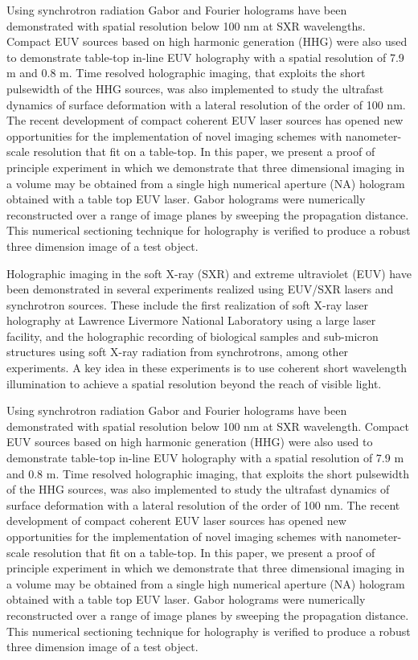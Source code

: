 \documentclass[]{IEEEphot}
\begin{document}
Using synchrotron radiation Gabor and Fourier holograms have been demonstrated with spatial resolution below 100 nm at SXR wavelengths. Compact EUV sources based on high harmonic generation (HHG) were also used to demonstrate table-top in-line EUV holography with a spatial resolution of 7.9 m and 0.8 m.  Time resolved holographic imaging, that exploits the short pulsewidth of the HHG sources, was also implemented to study the ultrafast dynamics of surface deformation with a lateral resolution of the order of 100 nm.  The recent development of compact coherent EUV laser sources  has opened new opportunities for the implementation of novel imaging schemes with nanometer-scale resolution that fit on a table-top. In this paper, we present a proof of principle experiment in which we demonstrate that three dimensional imaging in a volume may be obtained from a single high numerical  aperture (NA) hologram obtained with a table top EUV laser. Gabor holograms were numerically reconstructed over a range of image planes by sweeping the propagation distance. This numerical sectioning technique for holography is verified to produce a robust three dimension image of a test object.  

Holographic imaging in the soft X-ray (SXR) and extreme ultraviolet (EUV) have been demonstrated in several experiments realized using EUV/SXR lasers and synchrotron sources. These include the first realization of soft X-ray laser holography at Lawrence Livermore National Laboratory using a large laser facility, and the holographic recording of biological samples and sub-micron structures using soft X-ray radiation from synchrotrons, among other experiments.  A key idea in these experiments is to use coherent short wavelength illumination to achieve a spatial resolution beyond the reach of visible light.  

Using synchrotron radiation Gabor and Fourier holograms have been demonstrated with spatial resolution below 100 nm at SXR wavelength.  Compact EUV sources based on high harmonic generation (HHG) were also used to demonstrate table-top in-line EUV holography with a spatial resolution of 7.9 m and 0.8 m.  Time resolved holographic imaging, that exploits the short pulsewidth of the HHG sources, was also implemented to study the ultrafast dynamics of surface deformation with a lateral resolution of the order of 100 nm.  The recent development of compact coherent EUV laser sources has opened new opportunities for the implementation of novel imaging schemes with nanometer-scale resolution that fit on a table-top. In this paper, we present a proof of principle experiment in which we demonstrate that three dimensional imaging in a volume may be obtained from a single high numerical  aperture (NA) hologram obtained with a table top EUV laser. Gabor holograms were numerically reconstructed over a range of image planes by sweeping the propagation distance. This numerical sectioning technique for holography is verified to produce a robust three dimension image of a test object.  
\end{document}
